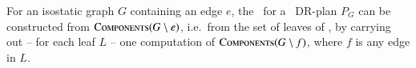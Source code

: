 \begin{figure}
{    %
    }
    \label{fig:seq_proof}
\end{figure}


\begin{lemma}
\label{lem:branch-from-branch-leaves}
    For an isostatic graph $G$ containing an edge $e$, the \branchGePG\ for a \pseudosequential\ DR-plan $P_G$ can be constructed from $\textsc{Components}(G\setminus e)$, i.e.\ from the set of leaves of \branchGePG, by carrying out -- for each leaf $L$ -- one computation of $\textsc{Components}(G\setminus f)$, where $f$ is any edge in $L$.
\end{lemma}



